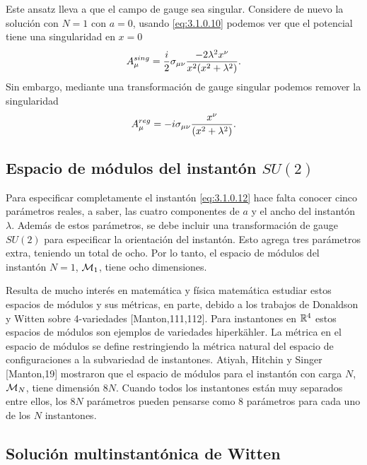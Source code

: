Este ansatz lleva a que el campo de gauge sea singular. Considere de nuevo la solución con $N=1$ con $a=0$, usando \eqref{eq:3.1.0.10} podemos ver que el potencial tiene una singularidad en $x=0$
\begin{align}
	A_\mu^{sing} = \frac{i}{2}\sigma_{\mu\nu}\frac{-2\lambda^2x^\nu}{x^2(x^2+\lambda^2)}. \label{eq:3.1.0.13}
\end{align}
Sin embargo, mediante una transformación de gauge singular podemos remover la singularidad
\begin{align}
	A_\mu^{reg} = -i\sigma_{\mu\nu}\frac{x^\nu}{(x^2+\lambda^2)}. \label{eq:3.1.0.14}
\end{align}

\subsection{Espacio de módulos del instantón $SU(2)$}

Para especificar completamente el instantón \eqref{eq:3.1.0.12} hace falta conocer cinco parámetros reales, a saber, las cuatro componentes de $a$ y el ancho del instantón $\lambda$. Además de estos parámetros, se debe incluir una transformación de gauge $SU(2)$ para especificar la orientación del instantón. Esto agrega tres parámetros extra, teniendo un total de ocho. Por lo tanto, el espacio de módulos del instantón $N=1$, $\mathcal{M}_1$, tiene ocho dimensiones.

Resulta de mucho interés en matemática y física matemática estudiar estos espacios de módulos y sus métricas, en parte, debido a los trabajos de Donaldson y Witten sobre 4-variedades [Manton,111,112].  Para instantones en $\mathbb{R}^4$ estos espacios de módulos son ejemplos de variedades hiperkähler. La métrica en el espacio de módulos se define restringiendo la métrica natural del espacio de configuraciones a la subvariedad de instantones. Atiyah, Hitchin y Singer [Manton,19] mostraron que el espacio de módulos para el instantón con carga $N$, $\mathcal{M}_N$, tiene dimensión $8N$. Cuando todos los instantones están muy separados entre ellos, los $8N$ parámetros pueden pensarse como $8$ parámetros para cada uno de los $N$ instantones.

\subsection{Solución multinstantónica de Witten}

